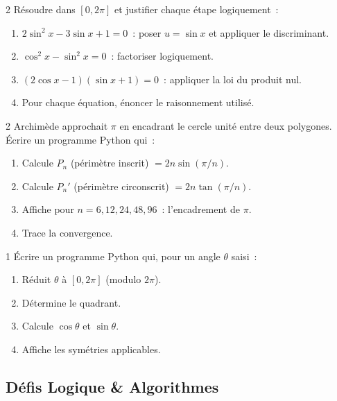\begin{probleme}{2}
R\'esoudre dans $[0,2\pi]$ et justifier chaque \'etape logiquement~:
\begin{enumerate}
  \item $2\sin^2x-3\sin x+1=0$~: poser $u=\sin x$ et appliquer le discriminant.
  \item $\cos^2x-\sin^2x=0$~: factoriser logiquement.
  \item $(2\cos x-1)(\sin x+1)=0$~: appliquer la loi du produit nul.
  \item Pour chaque \'equation, \'enoncer le raisonnement utilis\'e.
\end{enumerate}
\end{probleme}

\begin{probleme}{2}
Archim\`ede approchait $\pi$ en encadrant le cercle unit\'e entre deux polygones.
\'Ecrire un programme Python qui~:
\begin{enumerate}
  \item Calcule $P_n$ (p\'erim\`etre inscrit) $= 2n\sin(\pi/n)$.
  \item Calcule $P_n'$ (p\'erim\`etre circonscrit) $= 2n\tan(\pi/n)$.
  \item Affiche pour $n=6,12,24,48,96$~: l'encadrement de $\pi$.
  \item Trace la convergence.
\end{enumerate}
\end{probleme}

\begin{probleme}{1}
\'Ecrire un programme Python qui, pour un angle $\theta$ saisi~:
\begin{enumerate}
  \item R\'eduit $\theta$ \`a $[0,2\pi]$ (modulo $2\pi$).
  \item D\'etermine le quadrant.
  \item Calcule $\cos\theta$ et $\sin\theta$.
  \item Affiche les sym\'etries applicables.
\end{enumerate}
\end{probleme}

\subsection*{D\'efis Logique \& Algorithmes}

